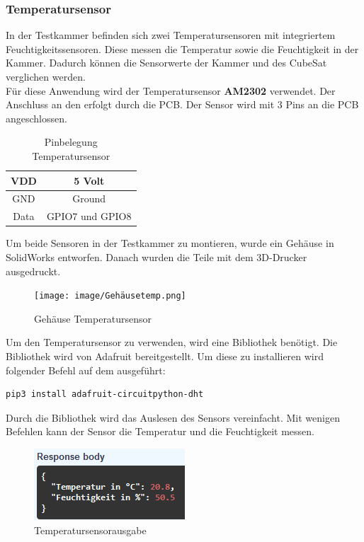 \subsubsection{Temperatursensor}\label{sec:Temperatursensor}
In der Testkammer befinden sich zwei Temperatursensoren mit integriertem Feuchtigkeitssensoren. Diese messen die Temperatur sowie die Feuchtigkeit in der Kammer. Dadurch können die Sensorwerte der Kammer und des CubeSat verglichen werden.\\
\vspace{3mm}
Für diese Anwendung wird der Temperatursensor \textbf{AM2302} \autocite{AM2302} verwendet. Der Anschluss an den \raspi erfolgt durch die PCB. Der Sensor wird mit 3 Pins an die PCB angeschlossen.\\
\vspace{3mm}
\begin{table}[H]
    \centering
    \begin{tabular}{ | c | c | } 
  \hline
   VDD & 5 Volt\\ 
  \hline
   GND & Ground\\ 
  \hline
   Data & GPIO7 und GPIO8\\ 
  \hline
\end{tabular}
    \caption{Pinbelegung Temperatursensor}
\end{table}
Um beide Sensoren in der Testkammer zu montieren, wurde ein Gehäuse in SolidWorks entworfen. Danach wurden die Teile mit dem 3D-Drucker ausgedruckt.\\
\vspace{2mm}
\begin{figure}[H]
\centering
\texttt{[image: image/Gehäusetemp.png]}
\caption{Gehäuse Temperatursensor}
\end{figure}
\newpage
Um den Temperatursensor zu verwenden, wird eine Bibliothek benötigt. Die Bibliothek wird von Adafruit bereitgestellt. Um diese zu installieren wird folgender Befehl auf dem \raspi ausgeführt:\\
\begin{verbatim}
pip3 install adafruit-circuitpython-dht
\end{verbatim}
Durch die Bibliothek\autocite{Adafruit_DHT} wird das Auslesen des Sensors vereinfacht. Mit wenigen Befehlen kann der Sensor die Temperatur und die Feuchtigkeit messen.\\
\vspace{3mm}
\begin{figure}[H]
    \centering
    \includegraphics[scale=1.5]{image/Tempausgabe.png}
    \caption{Temperatursensorausgabe}
    \label{fig:enter-label}
\end{figure}
